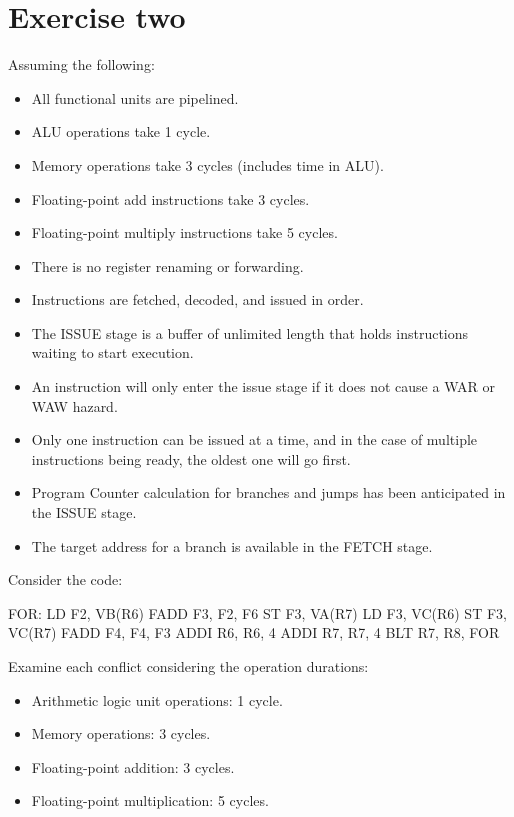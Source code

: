 \section{Exercise two}

Assuming the following:
\begin{itemize}
    \item All functional units are pipelined.
    \item ALU operations take 1 cycle.
    \item Memory operations take 3 cycles (includes time in ALU).
    \item Floating-point add instructions take 3 cycles.
    \item Floating-point multiply instructions take 5 cycles.
    \item There is no register renaming or forwarding.
    \item Instructions are fetched, decoded, and issued in order.
    \item The ISSUE stage is a buffer of unlimited length that holds instructions waiting to start execution.
    \item An instruction will only enter the issue stage if it does not cause a WAR or WAW hazard.
    \item Only one instruction can be issued at a time, and in the case of multiple instructions being ready, the oldest one will go first.
    \item Program Counter calculation for branches and jumps has been anticipated in the ISSUE stage.
    \item The target address for a branch is available in the FETCH stage.
\end{itemize}
Consider the code:
\begin{verbnobox}[\verbarg]
FOR:    LD F2, VB(R6)
        FADD F3, F2, F6
        ST F3, VA(R7)
        LD F3, VC(R6)
        ST F3, VC(R7)
        FADD F4, F4, F3
        ADDI R6, R6, 4
        ADDI R7, R7, 4
        BLT R7, R8, FOR
\end{verbnobox}
Examine each conflict considering the operation durations:
\begin{itemize}
    \item Arithmetic logic unit operations: 1 cycle.
    \item Memory operations: 3 cycles.
    \item Floating-point addition: 3 cycles.
    \item Floating-point multiplication: 5 cycles.
\end{itemize}

